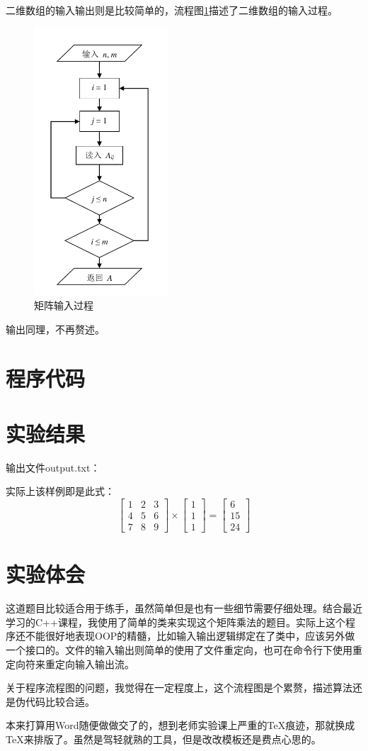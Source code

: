 \documentclass[cs4size,a4paper,nofonts]{ctexart}
\begin{document}
二维数组的输入输出则是比较简单的，流程图\ref{f1}描述了二维数组的输入过程。
\begin{figure}[htp]
\centering
\includegraphics[height=10cm]{alys01/f1.pdf}
\caption{\label{f1}矩阵输入过程}
\end{figure}

输出同理，不再赘述。

\section{程序代码}
{\linespread{1}}

\section{实验结果}
输出文件output.txt：
\begin{quote}

\end{quote}

实际上该样例即是此式：
\[
\left[\begin{array}{ccc}
1 & 2 & 3\\
4 & 5 & 6\\
7 & 8 & 9
\end{array}\right]
\times
\left[\begin{array}{c}
1\\
1\\
1
\end{array}\right]
=
\left[\begin{array}{c}
   6\\
  15\\
  24
\end{array}\right]
\]

\section{实验体会}
这道题目比较适合用于练手，虽然简单但是也有一些细节需要仔细处理。结合最近学习的C++课程，我使用了简单的类来实现这个矩阵乘法的题目。实际上这个程序还不能很好地表现OOP的精髓，比如输入输出逻辑绑定在了类中，应该另外做一个接口的。文件的输入输出则简单的使用了文件重定向，也可在命令行下使用重定向符来重定向输入输出流。

关于程序流程图的问题，我觉得在一定程度上，这个流程图是个累赘，描述算法还是伪代码比较合适。

本来打算用Word随便做做交了的，想到老师实验课上严重的\TeX 痕迹，那就换成\TeX 来排版了。虽然是驾轻就熟的工具，但是改改模板还是费点心思的。
\end{document}
